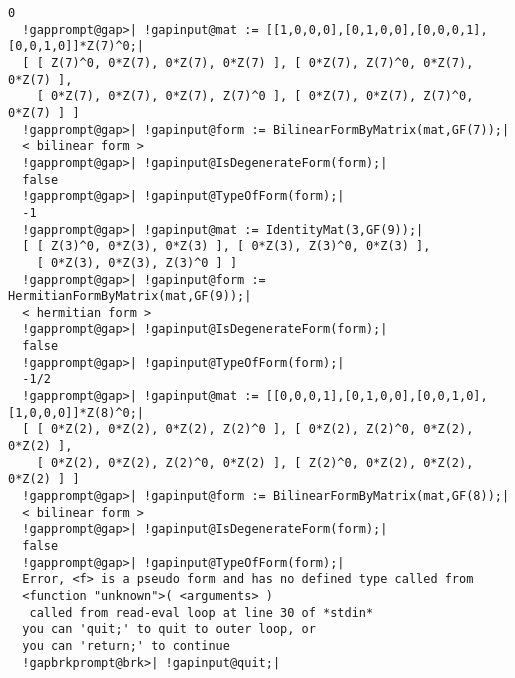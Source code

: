 \documentclass[a4paper,11pt]{report}
\newcommand{\logpage}[1]{\protect\write\pagenrlog{#1, \thepage,}}
\begin{document}
{{{\begin{Verbatim}[commandchars=!@|,fontsize=\small,frame=single,label=Example]
  0
  !gapprompt@gap>| !gapinput@mat := [[1,0,0,0],[0,1,0,0],[0,0,0,1],[0,0,1,0]]*Z(7)^0;|
  [ [ Z(7)^0, 0*Z(7), 0*Z(7), 0*Z(7) ], [ 0*Z(7), Z(7)^0, 0*Z(7), 0*Z(7) ], 
    [ 0*Z(7), 0*Z(7), 0*Z(7), Z(7)^0 ], [ 0*Z(7), 0*Z(7), Z(7)^0, 0*Z(7) ] ]
  !gapprompt@gap>| !gapinput@form := BilinearFormByMatrix(mat,GF(7));|
  < bilinear form >
  !gapprompt@gap>| !gapinput@IsDegenerateForm(form);|
  false
  !gapprompt@gap>| !gapinput@TypeOfForm(form);|
  -1
  !gapprompt@gap>| !gapinput@mat := IdentityMat(3,GF(9));|
  [ [ Z(3)^0, 0*Z(3), 0*Z(3) ], [ 0*Z(3), Z(3)^0, 0*Z(3) ], 
    [ 0*Z(3), 0*Z(3), Z(3)^0 ] ]
  !gapprompt@gap>| !gapinput@form := HermitianFormByMatrix(mat,GF(9));|
  < hermitian form >
  !gapprompt@gap>| !gapinput@IsDegenerateForm(form);|
  false
  !gapprompt@gap>| !gapinput@TypeOfForm(form);|
  -1/2
  !gapprompt@gap>| !gapinput@mat := [[0,0,0,1],[0,1,0,0],[0,0,1,0],[1,0,0,0]]*Z(8)^0;|
  [ [ 0*Z(2), 0*Z(2), 0*Z(2), Z(2)^0 ], [ 0*Z(2), Z(2)^0, 0*Z(2), 0*Z(2) ], 
    [ 0*Z(2), 0*Z(2), Z(2)^0, 0*Z(2) ], [ Z(2)^0, 0*Z(2), 0*Z(2), 0*Z(2) ] ]
  !gapprompt@gap>| !gapinput@form := BilinearFormByMatrix(mat,GF(8));|
  < bilinear form >
  !gapprompt@gap>| !gapinput@IsDegenerateForm(form);|
  false
  !gapprompt@gap>| !gapinput@TypeOfForm(form);|
  Error, <f> is a pseudo form and has no defined type called from
  <function "unknown">( <arguments> )
   called from read-eval loop at line 30 of *stdin*
  you can 'quit;' to quit to outer loop, or
  you can 'return;' to continue
  !gapbrkprompt@brk>| !gapinput@quit;|
  
\end{Verbatim}
 }

 }

 }

 \def\bibname{References\logpage{[ "Bib", 0, 0 ]}
\hyperdef{L}{X7A6F98FD85F02BFE}{}
}





\def\indexname{Index\logpage{[ "Ind", 0, 0 ]}
\hyperdef{L}{X83A0356F839C696F}{}
}

\cleardoublepage
{}
{}


\printindex
\end{document}
